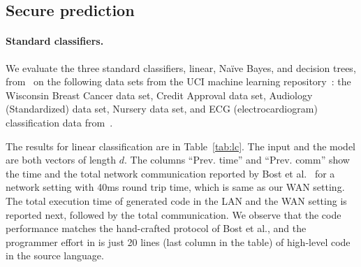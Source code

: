 
\subsection{Secure prediction}
\paragraph{Standard classifiers.}
We evaluate the three standard classifiers, linear, Na\"{i}ve Bayes, and
decision trees, from~\cite{shafindss} on the following data sets from the UCI
machine learning repository~\cite{uci}:
 the Wisconsin Breast Cancer data set, 
Credit Approval data set, Audiology (Standardized) data set, Nursery
data set, and ECG (electrocardiogram) classification data
from~\cite{barni}.

The results for linear
classification are in Table~\ref{tab:lc}.
The input and the model are both vectors of length $d$. 
The columns ``Prev. time'' and ``Prev. comm'' show the time and the total
network communication reported by Bost et al.~\cite{shafindss} for a
network setting with 40ms
round trip time, which is same as our WAN setting. The total execution
time
of \tool generated code in the LAN and the WAN setting is reported
next, followed by the total communication.
We observe that the \tool code performance matches the hand-crafted protocol of Bost
et al., and the programmer effort in \tool is just 20
lines (last column in the table) of high-level code in the \tool
source language. %


